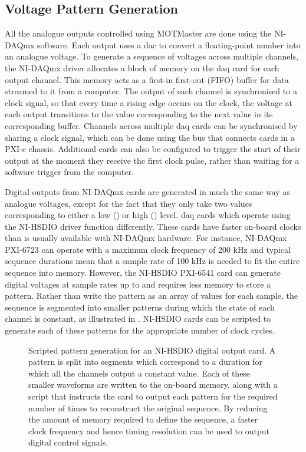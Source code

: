 \subsection{Voltage Pattern Generation}\label{subsec:compinterface_patterngen}
All the analogue outputs controlled using MOTMaster are done using the
NI-DAQmx software. Each output uses a \ac{dac} to convert a floating-point
number into an analogue voltage. To generate a sequence of voltages across
multiple channels, the NI-DAQmx driver allocates a block of memory on the
\ac{daq} card for each output channel. This memory acts as a first-in
first-out (FIFO) buffer for data streamed to it from a computer. The output
of each channel is synchronised to a clock signal, so that every time a
rising edge occurs on the clock, the voltage at each output transitions to
the value corresponding to the next value in its corresponding buffer.
Channels across multiple \ac{daq} cards can be synchronised by sharing a
clock signal, which can be done using the bus that connects cards in a PXI-e
chassis. Additional cards can also be configured to trigger the start of
their output at the moment they receive the first clock pulse, rather than
waiting for a software trigger from the computer. \par\noindent 
Digital outputs from NI-DAQmx cards are generated in much the same way as
analogue voltages, except for the fact that they only take two values
corresponding to either a low () or high
() level. \ac{daq} cards which operate using the
NI-HSDIO driver function differently. These cards have faster on-board clocks
than is usually available with NI-DAQmx hardware. For instance, NI-DAQmx
PXI-6723 can operate with a maximum clock frequency of 200 kHz and typical
sequence durations mean that a sample rate of 100 kHz is needed to fit the
entire sequence into memory. However, the NI-HSDIO PXI-6541 card can generate
digital voltages at sample rates up to  and requires
less memory to store a pattern. Rather than write the pattern as an array of
values for each sample, the sequence is segmented into smaller patterns
during which the state of each channel is constant, as illustrated in
. NI-HSDIO cards can be scripted to generate each
of these patterns for the appropriate number of clock cycles.
\begin{figure}
    \centering
    
    \caption[Scripted pattern generation for an NI-HSDIO card]{Scripted
    pattern generation for an NI-HSDIO digital output card. A pattern is
    split into segments which correspond to a duration for which all the
    channels output a constant value. Each of these smaller waveforms are
    written to the on-board memory, along with a script that instructs the
    card to output each pattern for the required number of times to
    reconstruct the original sequence. By reducing the amount of memory
    required to define the sequence, a faster clock frequency and hence
    timing resolution can be used to output digital control
    signals.}\label{fig:hsdio_timing}
\end{figure}
